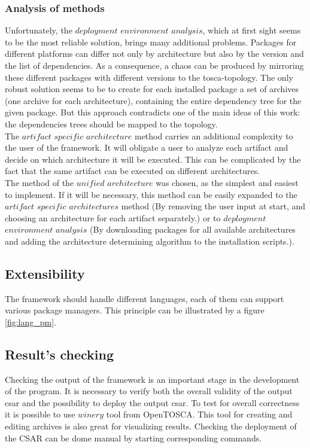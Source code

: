 \subsubsection*{Analysis of methods}
Unfortunately, the $deployment$ $environment$ $analysis$, which at first sight seems to be the most reliable solution, brings many additional problems.
Packages for different platforms can differ not only by architecture but also by the version and the list of dependencies.
As a consequence, a chaos can be produced by mirroring these different packages with different versions to the \gls{tosca}-topology.
The only robust solution seems to be to create for each installed package a set of archives (one archive for each architecture), containing the entire dependency tree for the given package.
But this approach contradicts one of the main ideas of this work: the dependencies trees should be mapped to the topology.\\
The $artifact$ $specific$ $architecture$ method carries an additional complexity to the user of the framework.
It will obligate a user to analyze each artifact and decide on which architecture it will be executed. 
This can be complicated by the fact that the same artifact can be executed on different architectures.\\
The method of the $unified$ $architecture$ was chosen, as the simplest and easiest to implement.
If it will be necessary, this method can be easily expanded to the $artifact$ $specific$ $architectures$ method (By removing the user input at start, and choosing an architecture for each artifact separately.) or to $deployment$ $environment$ $analysis$ (By downloading packages for all available architectures and adding the architecture determining algorithm to the installation scripts.).

\subsection{Extensibility}
The framework should handle different languages, each of them can support various package managers.
This principle can be illustrated by a figure \ref{fig:lang_pm}.


\subsection{Result's checking}
Checking the output of the framework is an important stage in the development of the program.
It is necessary to verify both the overall validity of the output \gls{csar} and the possibility to deploy the output \gls{csar}.
To test for overall correctness it is possible to use $winery$ tool from OpenTOSCA.
This tool for creating and editing archives is also great for visualizing results.
Checking the deployment of the CSAR can be dome manual by starting corresponding commands.

